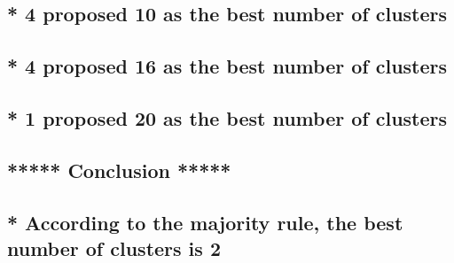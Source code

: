 \documentclass[]{article}
\begin{document}
\hypertarget{proposed-10-as-the-best-number-of-clusters}{%
\subsection{* 4 proposed 10 as the best number of
clusters}\label{proposed-10-as-the-best-number-of-clusters}}

\hypertarget{proposed-16-as-the-best-number-of-clusters}{%
\subsection{* 4 proposed 16 as the best number of
clusters}\label{proposed-16-as-the-best-number-of-clusters}}

\hypertarget{proposed-20-as-the-best-number-of-clusters}{%
\subsection{* 1 proposed 20 as the best number of
clusters}\label{proposed-20-as-the-best-number-of-clusters}}

\hypertarget{section-3}{%
\subsection{}\label{section-3}}

\hypertarget{conclusion}{%
\subsection{\texorpdfstring{***** Conclusion *****\\
}{***** Conclusion ***** }}\label{conclusion}}

\hypertarget{according-to-the-majority-rule-the-best-number-of-clusters-is-2}{%
\subsection{* According to the majority rule, the best number of
clusters is
2}\label{according-to-the-majority-rule-the-best-number-of-clusters-is-2}}

\hypertarget{section-4}{%
\subsection{}\label{section-4}}

\hypertarget{section-5}{%
\subsection{}\label{section-5}}
\end{document}
